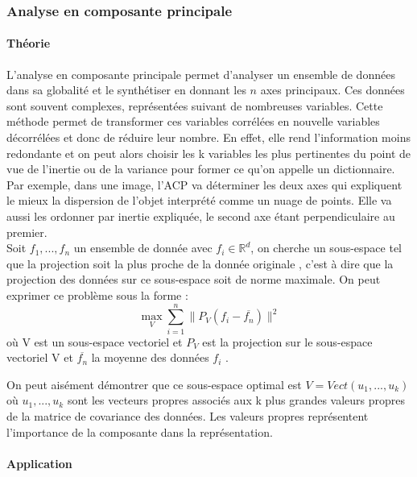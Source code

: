 \documentclass{article}
\begin{document}
\subsubsection{Analyse en composante principale}

\paragraph{Théorie} L'analyse en composante principale \cite{bib:PCA} permet d'analyser un ensemble de données dans sa globalité et le synthétiser en donnant les $n$ axes principaux. Ces données sont souvent complexes, représentées suivant de nombreuses variables. Cette méthode permet de transformer ces variables corrélées en nouvelle variables décorrélées et donc de réduire leur nombre. En effet, elle rend l'information moins redondante et on peut alors choisir les k variables les plus pertinentes du point de vue de l'inertie ou de la variance pour former ce qu'on appelle un dictionnaire. \\
Par exemple, dans une image, l'ACP va déterminer les deux axes qui expliquent le mieux la dispersion de l'objet interprété comme un nuage de points. Elle va aussi les ordonner par inertie expliquée, le second axe étant perpendiculaire au premier.\\

Soit $f_1,...,f_n$  un ensemble de donnée avec $f_i \in \mathbb{R}^d$, on cherche un sous-espace tel que la projection soit la plus proche de la donnée originale , c'est à dire que la projection des données sur ce sous-espace soit de norme maximale. On peut exprimer ce problème sous la forme :
$$\max_V \sum_{i=1}^n \parallel P_V(f_i-\overline{f_n}) \parallel ^2$$
où V est un sous-espace vectoriel et $P_V$ est la projection sur le sous-espace vectoriel V et $\overline{f_n}$ la moyenne des données $f_i$ .

On peut aisément démontrer que ce sous-espace optimal est $V=Vect(u_1,..., u_k)$ où $u_1,..., u_k$ sont les vecteurs propres associés aux k plus grandes valeurs propres de la matrice de covariance des données. Les valeurs propres représentent l'importance de la composante dans la représentation.


\paragraph{Application}
\end{document}
